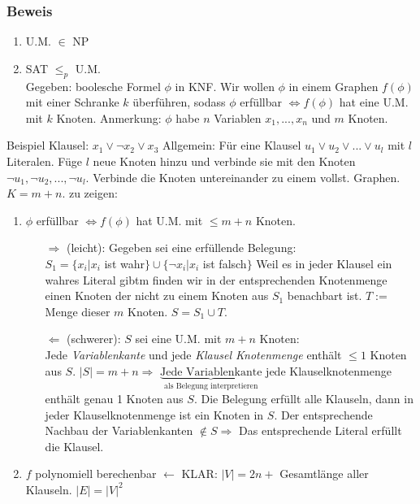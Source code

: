 \subsubsection{Beweis}
\begin{enumerate}
\item U.M. $\in$ NP
\item SAT $\leq_p$ U.M.\\
Gegeben: boolesche Formel $\phi$ in KNF. Wir wollen $\phi$ in einem Graphen $f(\phi)$ mit einer Schranke $k$ überführen, sodass $\phi$ erfüllbar $\Leftrightarrow f(\phi)$ hat eine U.M. mit $k$ Knoten. Anmerkung: $\phi$ habe $n$ Variablen $x_1,...,x_n$ und $m$ Knoten.
\end{enumerate}
Beispiel Klausel: $x_1 \lor \lnot{x}_2 \lor x_3$ Allgemein: Für eine Klausel $u_1 \lor u_2 \lor ... \lor u_l$ mit $l$ Literalen. Füge $l$ neue Knoten hinzu und verbinde sie mit den Knoten $\lnot{u}_1, \lnot{u}_2, ... , \lnot{u}_l$. Verbinde die Knoten untereinander zu einem vollst. Graphen. $K = m+n$.
zu zeigen:
\begin{enumerate}
\item $\phi$ erfüllbar $\Leftrightarrow f(\phi)$ hat U.M. mit $\leq m+n$ Knoten.
\begin{enumerate}
\item[$\Rightarrow$] (leicht): Gegeben sei eine erfüllende Belegung:\\
$S_1 = \{ x_i | x_i$ ist wahr$\} \cup \{\lnot{x}_i | x_i$ ist falsch$\}$ Weil es in jeder Klausel ein wahres Literal gibtm finden wir in der entsprechenden Knotenmenge einen Knoten der nicht zu einem Knoten aus $S_1$ benachbart ist. $T:=$Menge dieser $m$ Knoten. $S = S_1 \cup T$.
\item[$\Leftarrow$] (schwerer): $S$ sei eine U.M. mit $m+n$ Knoten:\\
Jede \emph{Variablenkante} und jede \emph{Klausel Knotenmenge} enthält $\leq 1$ Knoten aus $S$. $|S|=m+n \Rightarrow$ $\underbrace{ \text{Jede Variablenkante}}_{ \text{als Belegung interpretieren}}$ jede Klauselknotenmenge enthält genau 1 Knoten aus $S$. Die Belegung erfüllt alle Klauseln, dann in jeder Klauselknotenmenge ist ein Knoten in $S$. Der entsprechende Nachbau der Variablenkanten $\notin S \Rightarrow$ Das entsprechende Literal erfüllt die Klausel.\\
\end{enumerate}
\item $f$ polynomiell berechenbar $\leftarrow$ KLAR: $|V|= 2n +$ Gesamtlänge aller Klauseln. $|E| = |V|^2$ \checkmark 
\end{enumerate}
